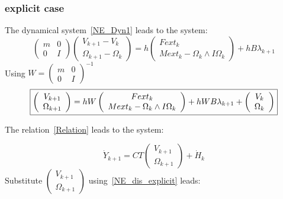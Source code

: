 \subsubsection{explicit case}
The dynamical system~\ref{NE_Dyn1} leads to the system:
\begin{equation}
  \left(\begin{array}{cc} m&0\\0&I\end{array}\right)
   \left(\begin{array}{c} V_{k+1} - V_k\\ \Omega _{k+1} - \Omega _{k}\end{array}\right)=
   h\left(\begin{array}{c} Fext_k\\ Mext_k - \Omega _k \wedge I\Omega _k \end{array}\right)+
   h B \lambda _{k+1}
  \end{equation}
Using $W = \left(\begin{array}{cc} m&0\\0&I\end{array}\right) ^{-1} $
\begin{equation}
  \label{NE_dis_explicit}
  \fbox{$
   \left(\begin{array}{c} V_{k+1} \\ \Omega _{k+1}\end{array}\right)=
   hW\left(\begin{array}{c} Fext_k\\ Mext_k - \Omega _k \wedge I\Omega _k \end{array}\right)+
   hWB \lambda _{k+1}+
   \left(\begin{array}{c} V_{k} \\ \Omega _{k}\end{array}\right)
   $}
  \end{equation}

The relation~\ref{Relation} leads to the system:

\[\dot Y _{k+1}= C T \left(\begin{array}{l} V_{k+1} \\ \Omega _{k+1} \end{array}\right) + \dot H _{k} \]
Substitute $  \left(\begin{array}{l} V_{k+1} \\ \Omega _{k+1} \end{array}\right) $
using~\ref{NE_dis_explicit} leads:

